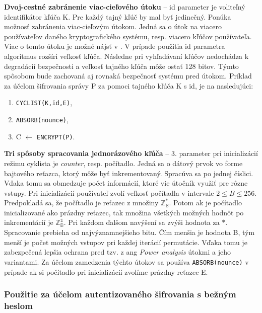\textbf{Dvoj-cestné zabránenie viac-cieľového útoku} -- id parameter je voliteľný identifikátor kľúča K. Pre každý tajný kľúč by mal byť jedinečný. Ponúka možnosť zabránenia viac-cieľovým útokom. Jedná sa o útok na viacero používateľov daného kryptografického systému, resp. viacero kľúčov používateľa. Viac o tomto útoku je možné nájsť v \cite{mta}. V prípade použitia id parametra algoritmus rozšíri veľkosť kľúča. Následne pri vyhľadávaní kľúčov nedochádza k degradácií bezpečnosti a veľkosť tajného kľúča môže ostať 128 bitov. Týmto spôsobom bude zachovaná aj rovnaká bezpečnosť systému pred útokom. 
Príklad za účelom šifrovania správy P za pomoci tajného kľúča K s id, je na nasledujúci:
\begin{enumerate}
	\item{\lstinline|CYCLIST(K,id,E)|},
	\item{\lstinline|ABSORB(nounce)|},
	\item{C $\gets$ \lstinline|ENCRYPT(P)|}.
\end{enumerate}

\textbf{Tri spôsoby spracovania jednorázového kľúča} -- 3. parameter pri inicializácií režimu cyklista je \textit{counter}, resp. počítadlo. Jedná sa o dátový prvok vo forme bajtového reťazca, ktorý môže byť inkrementovaný. Spracúva sa po jednej číslici. Vďaka tomu sa obmedzuje počet informácií, ktoré vie útočník využiť pre rôzne vstupy. Pri inicializácií používateľ zvolí veľkosť počítadla v intervale $2 \leq B \leq 256$. Predpokladá sa, že počítadlo je reťazec z množiny $\mathbb{Z^*_B}$. Potom ak je počítadlo inicializované ako prázdny reťazec, tak množina všetkých možných hodnôt po inkrementácií je $\mathbb{Z^1_B}$. Pri každom ďalšom navýšení sa zvýši hodnota za $*$. Spracovanie prebieha od najvýznamnejšieho bitu. Čím menšia je hodnota B, tým menší je počet možných vstupov pri každej iterácií permutácie. Vďaka tomu je zabezpečená lepšia ochrana pred tzv. z ang \textit{Power analysis} \cite{paa} útokmi a jeho variantami. Za účelom zamedzenia týchto útokov sa používa \lstinline|ABSORB(nounce)| v prípade ak si počítadlo pri inicializácií zvolíme prázdny reťazec E. 

\subsubsection{Použitie za účelom autentizovaného šifrovania s bežným heslom}